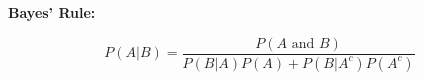 \documentclass[12pt]{amsart}
\begin{document}
\begin{list}
\vspace{.2in}

\item[] {\bf Bayes' Rule:}

$$P(A\vert B)=\frac{P(A{\text{ and }}B)}{P(B\vert A)P(A)+P(B\vert A^c)P(A^c)}$$
























\end{list}
\end{document}

